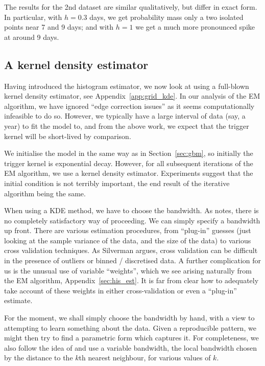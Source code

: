 \documentclass[twoside,a4paper]{article}
\theoremstyle{plain}
\theoremstyle{definition}
\begin{document}
The results for the 2nd dataset are similar qualitatively, but differ in exact form.
In particular, with $h=0.3$ days, we get probability mass only a two isolated points
near 7 and 9 days; and with $h=1$ we get a much more pronounced spike at around 9 days.


\subsection{A kernel density estimator}\label{sec:grid_kde}

Having introduced the histogram estimator, we now look at using a full-blown kernel density
estimator, see Appendix~\ref{app:grid_kde}.  In our analysis of the EM algorithm, we have
ignored ``edge correction issues'' as it seems computationally infeasible to do so.  However,
we typically have a large interval of data (say, a year) to fit the model to, and from the above
work, we expect that the trigger kernel will be short-lived by comparison.

We initialise the model in the same way as in Section~\ref{sec:gbm}, so initially the trigger
kernel is exponential decay.  However, for all subsequent iterations of the EM algorithm,
we use a kernel density estimator.  Experiments suggest that the initial condition is not
terribly important, the end result of the iterative algorithm being the same.

When using a KDE method, we have to choose the bandwidth.  As \cite[Section~3.4]{sil} notes,
there is no completely satisfactory way of proceeding.  We can simply specify a bandwidth
up front.  There are various estimation procedures, from ``plug-in'' guesses (just looking
at the sample variance of the data, and the size of the data) to various cross validation
techniques.  As Silverman argues, cross validation can be difficult in the presence of
outliers or binned / discretised data.  A further complication for us is the unusual use of
variable ``weights'', which we see arising naturally from the EM algorithm,
Appendix~\ref{sec:his_est}.  It is far from clear how to adequately take account of these
weights in either cross-validation or even a ``plug-in'' estimate.

For the moment, we shall simply choose the bandwidth by hand, with a view to attempting to
learn something about the data.  Given a reproducible pattern, we might then try to find
a parametric form which captures it.  For completeness, we also follow the idea of \cite{sepp}
and use a variable bandwidth, the local bandwidth chosen by the distance to the $k$th nearest
neighbour, for various values of $k$.
\end{document}

